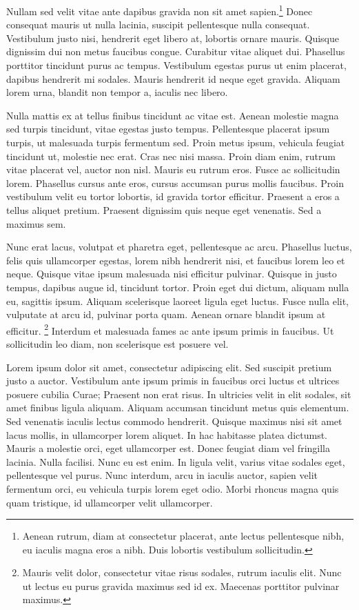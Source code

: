 Nullam sed velit vitae ante dapibus gravida non sit amet sapien.\footnote{Aenean rutrum, diam at consectetur placerat, ante lectus pellentesque nibh, eu iaculis magna eros a nibh. Duis lobortis vestibulum sollicitudin.} Donec consequat mauris ut nulla lacinia, suscipit pellentesque nulla consequat. Vestibulum justo nisi, hendrerit eget libero at, lobortis ornare mauris. Quisque dignissim dui non metus faucibus congue. Curabitur vitae aliquet dui. Phasellus porttitor tincidunt purus ac tempus. Vestibulum egestas purus ut enim placerat, dapibus hendrerit mi sodales. Mauris hendrerit id neque eget gravida. Aliquam lorem urna, blandit non tempor a, iaculis nec libero.

Nulla mattis ex at tellus finibus tincidunt ac vitae est. Aenean molestie magna sed turpis tincidunt, vitae egestas justo tempus. Pellentesque placerat ipsum turpis, ut malesuada turpis fermentum sed. Proin metus ipsum, vehicula feugiat tincidunt ut, molestie nec erat. Cras nec nisi massa. Proin diam enim, rutrum vitae placerat vel, auctor non nisl. Mauris eu rutrum eros. Fusce ac sollicitudin lorem. Phasellus cursus ante eros, cursus accumsan purus mollis faucibus. Proin vestibulum velit eu tortor lobortis, id gravida tortor efficitur. Praesent a eros a tellus aliquet pretium. Praesent dignissim quis neque eget venenatis. Sed a maximus sem.

Nunc erat lacus, volutpat et pharetra eget, pellentesque ac arcu. Phasellus luctus, felis quis ullamcorper egestas, lorem nibh hendrerit nisi, et faucibus lorem leo et neque. Quisque vitae ipsum malesuada nisi efficitur pulvinar. Quisque in justo tempus, dapibus augue id, tincidunt tortor. Proin eget dui dictum, aliquam nulla eu, sagittis ipsum. Aliquam scelerisque laoreet ligula eget luctus. Fusce nulla elit, vulputate at arcu id, pulvinar porta quam. Aenean ornare blandit ipsum at efficitur. \footnote{Mauris velit dolor, consectetur vitae risus sodales, rutrum iaculis elit. Nunc ut lectus eu purus gravida maximus sed id ex. Maecenas porttitor pulvinar maximus.} Interdum et malesuada fames ac ante ipsum primis in faucibus. Ut sollicitudin leo diam, non scelerisque est posuere vel.

Lorem ipsum dolor sit amet, consectetur adipiscing elit. Sed suscipit pretium justo a auctor. Vestibulum ante ipsum primis in faucibus orci luctus et ultrices posuere cubilia Curae; Praesent non erat risus. In ultricies velit in elit sodales, sit amet finibus ligula aliquam. Aliquam accumsan tincidunt metus quis elementum. Sed venenatis iaculis lectus commodo hendrerit. Quisque maximus nisi sit amet lacus mollis, in ullamcorper lorem aliquet. In hac habitasse platea dictumst. Mauris a molestie orci, eget ullamcorper est. Donec feugiat diam vel fringilla lacinia. Nulla facilisi. Nunc eu est enim. In ligula velit, varius vitae sodales eget, pellentesque vel purus. Nunc interdum, arcu in iaculis auctor, sapien velit fermentum orci, eu vehicula turpis lorem eget odio. Morbi rhoncus magna quis quam tristique, id ullamcorper velit ullamcorper.

